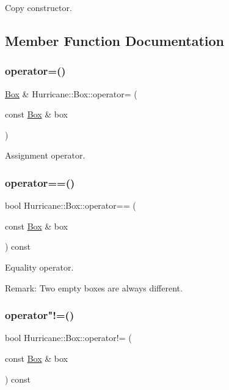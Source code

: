 Copy constructor. 

\subsection{Member Function Documentation}
\mbox{\label{classHurricane_1_1Box_a01abf59b3d3e99e694a7d4789f1bb978}} 
\subsubsection{\texorpdfstring{operator=()}{operator=()}}
{\footnotesize\ttfamily \hyperlink{classHurricane_1_1Box}{Box} \& Hurricane\+::\+Box\+::operator= (\begin{DoxyParamCaption}\item[{const \hyperlink{classHurricane_1_1Box}{Box} \&}]{box }\end{DoxyParamCaption})}

Assignment operator. \mbox{\label{classHurricane_1_1Box_a2a363ad0fdfda5a2f56b1b62a8665703}} 
\subsubsection{\texorpdfstring{operator==()}{operator==()}}
{\footnotesize\ttfamily bool Hurricane\+::\+Box\+::operator== (\begin{DoxyParamCaption}\item[{const \hyperlink{classHurricane_1_1Box}{Box} \&}]{box }\end{DoxyParamCaption}) const}

Equality operator.

\begin{DoxyParagraph}{Remark\+:}
Two empty boxes are always different. 
\end{DoxyParagraph}
\mbox{\label{classHurricane_1_1Box_a77a0e8c424c246973c455ce8e3ada8fb}} 
\subsubsection{\texorpdfstring{operator"!=()}{operator!=()}}
{\footnotesize\ttfamily bool Hurricane\+::\+Box\+::operator!= (\begin{DoxyParamCaption}\item[{const \hyperlink{classHurricane_1_1Box}{Box} \&}]{box }\end{DoxyParamCaption}) const}

